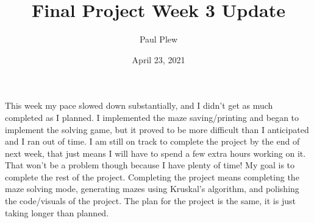\documentclass[12 pt]{article}
\title{Final Project Week 3 Update}
\author{Paul Plew}
\date{April 23, 2021}
\begin{document}
\maketitle
\indent This week my pace slowed down substantially, and I didn't get as much completed as I planned. I implemented the maze saving/printing and began to implement the solving game, but it proved to be more difficult than I anticipated and I ran out of time. I am still on track to complete the project by the end of next week, that just means I will have to spend a few extra hours working on it. That won't be a problem though because I have plenty of time! My goal is to complete the rest of the project. Completing the project means completing the maze solving mode, generating mazes using Kruskal's algorithm, and polishing the code/visuals of the project. The plan for the project is the same, it is just taking longer than planned.
\end{document}
